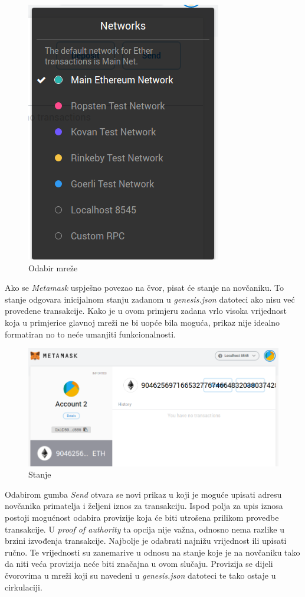 \documentclass[times, utf8, zavrsni, numeric]{fer}
\begin{document}
\begin{figure}[ht]
  \includegraphics[scale=0.5]{mmnetworkdd.png}
  \caption{Odabir mreže}
  \centering
\end{figure}

Ako se \emph{Metamask} uspješno povezao na čvor, pisat će stanje na novčaniku. To stanje odgovara inicijalnom stanju zadanom u \emph{genesis.json} datoteci ako
nisu već provedene transakcije. Kako je u ovom primjeru zadana vrlo visoka vrijednost koja u primjerice glavnoj mreži ne bi uopće bila moguća, prikaz nije idealno
formatiran no to neće umanjiti funkcionalnosti.

\begin{figure}[ht]
  \includegraphics[width=\textwidth]{mmimported.png}
  \caption{Stanje}
  \centering
\end{figure}

Odabirom gumba \emph{Send} otvara se novi prikaz u koji je moguće upisati adresu novčanika primatelja i željeni iznos za transakciju. Ispod polja za upis iznosa
postoji mogućnost odabira provizije koja će biti utrošena prilikom provedbe transakcije. U \emph{proof of authority} ta opcija nije važna, odnosno nema razlike u brzini
izvođenja transakcije. Najbolje je odabrati najnižu vrijednost ili upisati ručno. Te vrijednosti su zanemarive u odnosu na stanje koje je na novčaniku tako da niti veća
provizija neće biti značajna u ovom slučaju. Provizija se dijeli čvorovima u mreži koji su navedeni u \emph{genesis.json} datoteci te tako ostaje u cirkulaciji.
\end{document}

